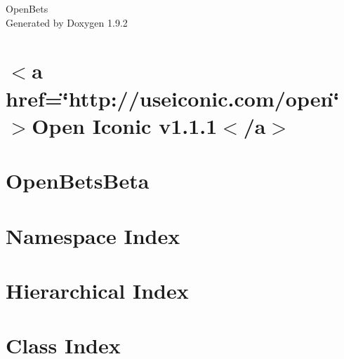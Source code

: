\documentclass[twoside]{book}
\newcommand{\+}{\discretionary{\mbox{\scriptsize$\hookleftarrow$}}{}{}}
\newcommand{\clearemptydoublepage}{%
    \newpage{\pagestyle{empty}\cleardoublepage}%
  }
\begin{document}
  \raggedbottom
    \hypersetup{pageanchor=false,
                bookmarksnumbered=true,
                pdfencoding=unicode
               }
  \begin{titlepage}
  \vspace*{7cm}
  \begin{center}%
  {\Large Open\+Bets}\\
  \vspace*{1cm}
  {\large Generated by Doxygen 1.9.2}\\
  \end{center}
  \end{titlepage}
  \clearemptydoublepage
  \tableofcontents
  \clearemptydoublepage
  \hypersetup{pageanchor=true}
\chapter{\texorpdfstring{$<$}{<}a href=\char`\"{}http\+://useiconic.\+com/open\char`\"{} \texorpdfstring{$>$}{>}Open Iconic v1.1.1\texorpdfstring{$<$}{<}/a\texorpdfstring{$>$}{>}}
\label{md__c___users__recallable_facts__documents__git_hub__open_bets__client_wwwroot_css_open_iconic__r_e_a_d_m_e}

\chapter{Open\+Bets\+Beta}
\label{md__c___users__recallable_facts__documents__git_hub__open_bets__r_e_a_d_m_e}

\chapter{Namespace Index}

\chapter{Hierarchical Index}

\chapter{Class Index}

\end{document}
